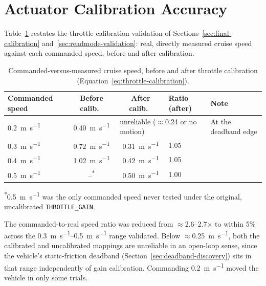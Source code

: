 \section{Actuator Calibration Accuracy}
\label{sec:results-throttle}

Table~\ref{tab:results-throttle-summary} restates the throttle
calibration validation of Sections~\ref{sec:final-calibration}
and~\ref{sec:readmode-validation}: real, directly measured cruise
speed against each commanded speed, before and after calibration.

\begin{table}[htbp]
  \centering
  \caption{Commanded-versus-measured cruise speed, before and after throttle calibration (Equation~\ref{eq:throttle-calibration}).}
  \label{tab:results-throttle-summary}
  \small
  \begin{tabular}{@{}lccp{2.3cm}p{2.6cm}@{}}
    \toprule
    Commanded speed & Before calib.\ & After calib.\ & Ratio (after) & Note \\
    \midrule
    \SI{0.2}{\meter\per\second} & \SI{0.40}{\meter\per\second} & \multicolumn{2}{l}{unreliable ($\approx$0.24 or no motion)} & At the deadband edge \\
    \SI{0.3}{\meter\per\second} & \SI{0.72}{\meter\per\second} & \SI{0.31}{\meter\per\second} & 1.05 & \\
    \SI{0.4}{\meter\per\second} & \SI{1.02}{\meter\per\second} & \SI{0.42}{\meter\per\second} & 1.05 & \\
    \SI{0.5}{\meter\per\second} & --\textsuperscript{*} & \SI{0.50}{\meter\per\second} & 1.00 & \\
    \bottomrule
  \end{tabular}

  \vspace{2pt}
  \raggedright\footnotesize\textsuperscript{*}\SI{0.5}{\meter\per\second}
  was the only commanded speed never tested under the original,
  uncalibrated \texttt{THROTTLE\_GAIN}.
\end{table}

The commanded-to-real speed ratio was reduced from
$\approx$2.6--2.7$\times$ to within 5\% across the
\SIrange{0.3}{0.5}{\meter\per\second} range validated. Below
$\approx$\SI{0.25}{\meter\per\second}, both the calibrated and
uncalibrated mappings are unreliable in an open-loop sense, since the
vehicle's static-friction deadband (Section~\ref{sec:deadband-discovery})
sits in that range independently of gain calibration. Commanding
\SI{0.2}{\meter\per\second} moved the vehicle in only some trials.

